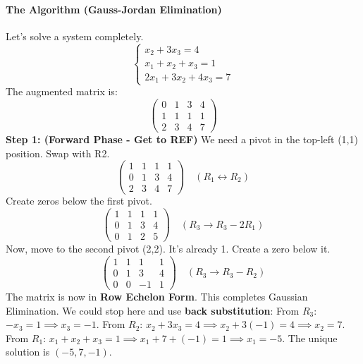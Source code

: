 \paragraph{The Algorithm (Gauss-Jordan Elimination)}
Let's solve a system completely.
\[
\begin{cases}
x_2 + 3x_3 = 4 \\
x_1 + x_2 + x_3 = 1 \\
2x_1 + 3x_2 + 4x_3 = 7
\end{cases}
\]
The augmented matrix is:
\[
\left(\begin{array}{ccc|c}
0 & 1 & 3 & 4 \\
1 & 1 & 1 & 1 \\
2 & 3 & 4 & 7
\end{array}\right)
\]
\textbf{Step 1: (Forward Phase - Get to REF)}
We need a pivot in the top-left (1,1) position. Swap with R2.
\[
\left(\begin{array}{ccc|c}
1 & 1 & 1 & 1 \\
0 & 1 & 3 & 4 \\
2 & 3 & 4 & 7
\end{array}\right) \quad (R_1 \leftrightarrow R_2)
\]
Create zeros below the first pivot.
\[
\left(\begin{array}{ccc|c}
1 & 1 & 1 & 1 \\
0 & 1 & 3 & 4 \\
0 & 1 & 2 & 5
\end{array}\right) \quad (R_3 \to R_3 - 2R_1)
\]
Now, move to the second pivot (2,2). It's already 1. Create a zero below it.
\[
\left(\begin{array}{ccc|c}
1 & 1 & 1 & 1 \\
0 & 1 & 3 & 4 \\
0 & 0 & -1 & 1
\end{array}\right) \quad (R_3 \to R_3 - R_2)
\]
The matrix is now in \textbf{Row Echelon Form}. This completes Gaussian Elimination.
We could stop here and use \textbf{back substitution}:
From $R_3$: $-x_3 = 1 \implies x_3 = -1$.
From $R_2$: $x_2 + 3x_3 = 4 \implies x_2 + 3(-1) = 4 \implies x_2 = 7$.
From $R_1$: $x_1 + x_2 + x_3 = 1 \implies x_1 + 7 + (-1) = 1 \implies x_1 = -5$.
The unique solution is $(-5, 7, -1)$.

